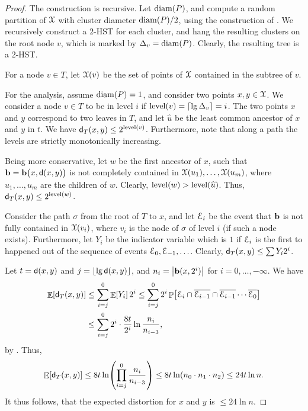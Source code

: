 \begin{proof}
    The construction is recursive. Let $\mathrm{diam}(P)$, and
    compute a random partition of $\FMS$ with cluster diameter
    $\mathrm{diam}(P)/2$, using the construction of . We
    recursively construct a $2$-HST for each cluster, and hang the
    resulting clusters on the root node $v$, which is marked by
    $\Delta_v = \mathrm{diam}(P)$. Clearly, the resulting tree is a $2$-HST.
    
    For a node $v \in T$, let $\FMS(v)$ be the set of points of $\FMS$
    contained in the subtree of $v$.

    For the analysis, assume $\mathrm{diam}(P)=1$, and consider two points
    $x,y \in \FMS$. We consider a node $v \in T$ to be in level $i$ if
    $\mathop{\mathrm{level}}(v) = \left\lceil {\lg \Delta_v } \right\rceil =i$. The two points $x$ and $y$
    correspond to two leaves in $T$, and let $\widehat{u}$ be the least common
    ancestor of $x$ and $y$ in $t$. We have $\mathsf{d}_T(x,y) \leq
    2^{\mathop{\mathrm{level}}(v)}$. Furthermore, note that along a path the levels are
    strictly monotonically increasing.
    
    Being more conservative, let $w$ be the first ancestor of $x$,
    such that $\mathbf{b} = \mathbf{b} \bigl( x,\mathsf{d}(x,y) \bigr)$ is not
    completely contained in $\FMS({u_1}), \ldots, \FMS({u_m})$, where
    $u_1, \ldots, u_m$ are the children of $w$. Clearly,
    $\level(w) > \level\pth{\widehat{ u}}$. Thus,
    $\mathsf{d}_T(x,y) \leq 2^{\mathop{\mathrm{level}}(w)}$.
    
    Consider the path $\sigma$ from the root of $T$ to $x$, and let
    $\EuScript{E}_i$ be the event that $\mathbf{b}$ is not fully contained in
    $\FMS(v_i)$, where $v_i$ is the node of $\sigma$ of level $i$ (if
    such a node exists). Furthermore, let $Y_i$ be the indicator
    variable which is $1$ if $\EuScript{E}_i$ is the first to happened out
    of the sequence of events $\EuScript{E}_0, \EuScript{E}_{-1}, \ldots$.
    Clearly, $\mathsf{d}_T(x,y) \leq \sum Y_i 2^i$.
    
    Let $t = \mathsf{d}(x,y)$ and $j = \left\lfloor {\lg \mathsf{d}(x,y)} \right\rfloor$, and $n_i =
    \left| {\mathbf{b}(x,2^i)} \right|$ for $i=0, \ldots, -\infty$. We have
    \begin{align*}
    \Ex{ \DistChar_T(x,y)} &\leq \sum_{i=j}^{0} \Ex{Y_i} 2^i \leq
    \sum_{i=j}^{0} 2^i \Prob{ \Event_i \cap \overline{\Event_{i-1}}
       \cap \overline{\Event_{i-1}} \cdots \overline{\Event_{0}}}
    \\&\leq
    \sum_{i=j}^{0} 2^i \cdot \frac{8t}{2^i} \ln \frac{n_i}{n_{i-3}},
    \end{align*}
    by . Thus,
    \begin{equation*}
    \Ex{ \DistChar_T(x,y)} \leq 8t \ln \pth{\prod_{i=j}^{0}
       \frac{n_i}{n_{i-3}}}
    \leq 8t \ln \pth{ n_0 \cdot n_1 \cdot n_2 }
    \leq 24 t \ln n.
    \end{equation*}
    It thus follows, that the expected distortion for $x$ and $y$ is
    $\leq 24 \ln n$.
\end{proof}

